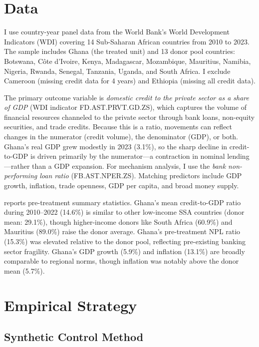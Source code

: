 \documentclass[12pt]{article}
\begin{document}
\section{Data}

I use country-year panel data from the World Bank's World Development Indicators (WDI) covering 14 Sub-Saharan African countries from 2010 to 2023. The sample includes Ghana (the treated unit) and 13 donor pool countries: Botswana, C\^{o}te d'Ivoire, Kenya, Madagascar, Mozambique, Mauritius, Namibia, Nigeria, Rwanda, Senegal, Tanzania, Uganda, and South Africa. I exclude Cameroon (missing credit data for 4 years) and Ethiopia (missing all credit data).

The primary outcome variable is \textit{domestic credit to the private sector as a share of GDP} (WDI indicator FD.AST.PRVT.GD.ZS), which captures the volume of financial resources channeled to the private sector through bank loans, non-equity securities, and trade credits. Because this is a ratio, movements can reflect changes in the numerator (credit volume), the denominator (GDP), or both. Ghana's real GDP grew modestly in 2023 (3.1\%), so the sharp decline in credit-to-GDP is driven primarily by the numerator---a contraction in nominal lending---rather than a GDP expansion. For mechanism analysis, I use the \textit{bank non-performing loan ratio} (FB.AST.NPER.ZS). Matching predictors include GDP growth, inflation, trade openness, GDP per capita, and broad money supply.



 reports pre-treatment summary statistics. Ghana's mean credit-to-GDP ratio during 2010--2022 (14.6\%) is similar to other low-income SSA countries (donor mean: 29.1\%), though higher-income donors like South Africa (60.9\%) and Mauritius (89.0\%) raise the donor average. Ghana's pre-treatment NPL ratio (15.3\%) was elevated relative to the donor pool, reflecting pre-existing banking sector fragility. Ghana's GDP growth (5.9\%) and inflation (13.1\%) are broadly comparable to regional norms, though inflation was notably above the donor mean (5.7\%).

\section{Empirical Strategy}

\subsection{Synthetic Control Method}
\end{document}
